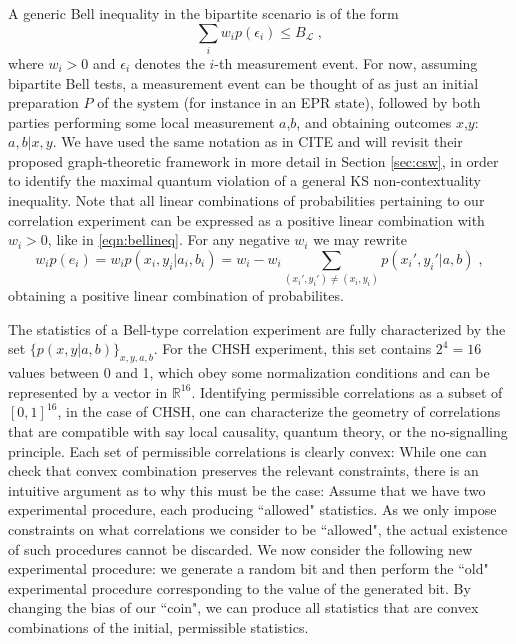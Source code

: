 A generic Bell inequality in the bipartite scenario is of the form
\begin{equation}
\sum_i w_i p(\epsilon_i)\leq B_\mathcal{L}\;,
\label{eqn:bellineq}
\end{equation}
where $w_i>0$ and $\epsilon_i$ denotes the $i$-th measurement event. For now, assuming bipartite Bell tests, a measurement event can be thought of as just an initial preparation $P$ of the system (for instance in an EPR state), followed by both parties performing some local measurement $a$,$b$, and obtaining outcomes $x$,$y$: $a,b \vert x,y$. We have used the same notation as in CITE and will revisit their proposed graph-theoretic framework in more detail in Section \ref{sec:csw}, in order to identify the maximal quantum violation of a general KS non-contextuality inequality. Note that all linear combinations of probabilities pertaining to our correlation experiment can be expressed as a positive linear combination with $w_i>0$, like in \ref{eqn:bellineq}. For any negative $w_i$ we may rewrite 
\begin{equation*}
w_i p(e_i)=w_i p(x_i,y_i\vert a_i,b_i)=w_i-w_i\sum\limits_{(x_i',y_i')\neq(x_i,y_i)} p(x_i',y_i' \vert a,b)\;,
\end{equation*} obtaining a positive linear combination of probabilites. 

The statistics of a Bell-type correlation experiment are fully characterized by the set $\{p(x,y\vert a,b)\}_{x,y,a,b}$. For the CHSH experiment, this set contains $2^4=16$ values between 0 and 1, which obey some normalization conditions and can be represented by a vector in $\mathbb{R}^{16}$. Identifying permissible correlations as a subset of $[0,1]^{16}$, in the case of CHSH, one can characterize the geometry of correlations that are compatible with say local causality, quantum theory, or the no-signalling principle. Each set of permissible correlations is clearly convex: While one can check that convex combination preserves the relevant constraints, there is an intuitive argument as to why this must be the case: Assume that we have two experimental procedure, each producing ``allowed" statistics. As we only impose constraints on what correlations we consider to be ``allowed", the actual existence of such procedures cannot be discarded. We now consider the following new experimental procedure: we generate a random bit and then perform the ``old" experimental procedure corresponding to the value of the generated bit. By changing the bias of our ``coin", we can produce all statistics that are convex combinations of the initial, permissible statistics.

